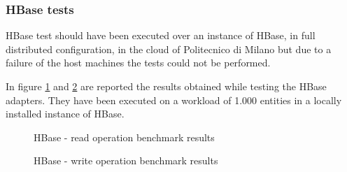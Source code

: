 \subsubsection{HBase tests}
HBase test should have been executed over an instance of HBase, in full distributed configuration, in the cloud of Politecnico di Milano but due to a failure of the host machines the tests could not be performed.

\noindent In figure \ref{fig:hbase-test-read} and \ref{fig:hbase-test-write} are reported the results obtained while testing the HBase adapters. They have been executed on a workload of 1.000 entities in a locally installed instance of HBase.

\begin{figure}[tbh]
  \centering
  \caption{HBase - read operation benchmark results}
  \label{fig:hbase-test-read}
\end{figure} 

\begin{figure}[tbh]
  \centering
  \caption{HBase - write operation benchmark results}
  \label{fig:hbase-test-write}
\end{figure} 

